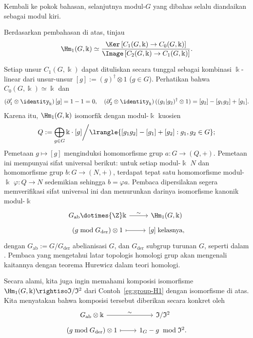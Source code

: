Kembali ke pokok bahasan, selanjutnya modul-$G$ yang dibahas selalu diandaikan
sebagai modul kiri.

\begin{contoh}\label{eg:group-H1-further}
	Berdasarkan pembahasan di atas, tinjau
	\[ \Hm_1(G, \Bbbk) \simeq \frac{\Ker\left[ C_1(G, \Bbbk) \to C_0(G, \Bbbk) \right]}{\Image\left[ C_2(G, \Bbbk) \to C_1(G, \Bbbk) \right]}. \]
	
	Setiap unsur $C_1(G,\Bbbk)$ dapat dituliskan secara tunggal sebagai
	kombinasi $\Bbbk$-linear dari unsur-unsur
	$[g]:=(g)^\dagger\otimes1$ ($g\in G$). Perhatikan bahwa
	$C_0(G,\Bbbk)\simeq\Bbbk$ dan
	\[ \left( \partial'_1 \otimes \identity_{\Bbbk}\right)[g] = 1 - 1 = 0, \quad \left( \partial'_2 \otimes \identity_{\Bbbk}\right)((g_1 | g_2)^\dagger \otimes 1) = [g_2] - [g_1 g_2] + [g_1]. \]
	Karena itu, $\Hm_1(G,\Bbbk)$ isomorfik dengan modul-$\Bbbk$ kuosien
	\[ Q := \bigoplus_{g \in G} \Bbbk \cdot [g] \bigg/ \lrangle{ [g_1 g_2] - [g_1] + [g_2] : g_1, g_2 \in G }; \]
	Pemetaan $g\mapsto[g]$ menginduksi homomorfisme grup $a:G\to(Q,+)$.
	Pemetaan ini mempunyai sifat universal berikut: untuk setiap modul-$\Bbbk$
	$N$ dan homomorfisme grup $b:G\to(N,+)$, terdapat tepat satu homomorfisme
	modul-$\Bbbk$ $\varphi:Q\to N$ sedemikian sehingga $b=\varphi a$.
	Pembaca dipersilakan segera memverifikasi sifat universal ini dan
	menurunkan darinya isomorfisme kanonik modul-$\Bbbk$
	\[\begin{tikzcd}[row sep=tiny]
		G_{\mathrm{ab}} \dotimes{\Z} \Bbbk \arrow[r, "\sim"] & \Hm_1(G, \Bbbk) \\
		(g \bmod G_{\mathrm{der}}) \otimes 1 \arrow[mapsto, r] & {[g] \;\text{kelasnya}},
	\end{tikzcd}\]
	dengan $G_{\mathrm{ab}}:=G/G_{\mathrm{der}}$ abelianisasi $G$, dan
	$G_{\mathrm{der}}$ subgrup turunan $G$, seperti dalam
	\cite[Definisi 4.7.2]{Li1}. Pembaca yang mengetahui latar topologis
	homologi grup akan mengenali kaitannya dengan teorema Hurewicz dalam teori
	homologi.
	
	Secara alami, kita juga ingin memahami komposisi isomorfisme
	$\Hm_1(G,\Bbbk)\rightiso\mathfrak{I}/\mathfrak{I}^2$ dari
	Contoh~\ref{eg:group-H1} dengan isomorfisme di atas. Kita menyatakan bahwa
	komposisi tersebut diberikan secara konkret oleh
	\[\begin{tikzcd}[row sep=tiny]
		G_{\mathrm{ab}} \otimes \Bbbk \arrow[r, "\sim"] & \mathfrak{I}/\mathfrak{I}^2 \\
		(g \bmod G_{\mathrm{der}}) \otimes 1 \arrow[mapsto, r] & 1_G - g \;\bmod \mathfrak{I}^2.
	\end{tikzcd}\]
	

\end{contoh}
